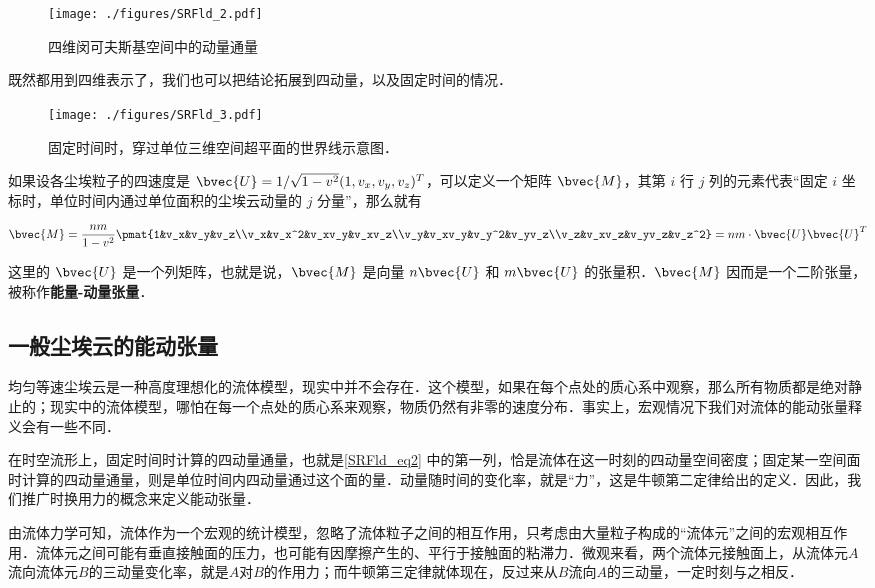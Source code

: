 \begin{figure}[ht]
\centering
\texttt{[image: ./figures/SRFld\_2.pdf]}
\caption{四维闵可夫斯基空间中的动量通量} \label{SRFld_fig2}
\end{figure}

既然都用到四维表示了，我们也可以把结论拓展到四动量，以及固定时间的情况．

\begin{figure}[ht]
\centering
\texttt{[image: ./figures/SRFld\_3.pdf]}
\caption{固定时间时，穿过单位三维空间超平面的世界线示意图．} \label{SRFld_fig3}
\end{figure}

如果设各尘埃粒子的四速度是 $\bvec{U}=1/\sqrt{1-v^2}(1, v_x, v_y, v_z)^T$，可以定义一个矩阵 $\bvec{M}$，其第 $i$ 行 $j$ 列的元素代表“固定 $i$ 坐标时，单位时间内通过单位面积的尘埃云动量的 $j$ 分量”，那么就有

\begin{equation}\label{SRFld_eq2}
\bvec{M}=\frac{nm}{1-v^2}\pmat{1&v_x&v_y&v_z\\v_x&v_x^2&v_xv_y&v_xv_z\\v_y&v_xv_y&v_y^2&v_yv_z\\v_z&v_xv_z&v_yv_z&v_z^2}=nm\cdot\bvec{U}\bvec{U}^T
\end{equation}

这里的 $\bvec{U}$ 是一个列矩阵，也就是说，$\bvec{M}$ 是向量 $n\bvec{U}$ 和 $m\bvec{U}$ 的张量积．$\bvec{M}$ 因而是一个二阶张量，被称作\textbf{能量-动量张量}．


\subsection{一般尘埃云的能动张量}

均匀等速尘埃云是一种高度理想化的流体模型，现实中并不会存在．这个模型，如果在每个点处的质心系中观察，那么所有物质都是绝对静止的；现实中的流体模型，哪怕在每一个点处的质心系来观察，物质仍然有非零的速度分布．事实上，宏观情况下我们对流体的能动张量释义会有一些不同．

在时空流形上，固定时间时计算的四动量通量，也就是\autoref{SRFld_eq2} 中的第一列，恰是流体在这一时刻的四动量空间密度；固定某一空间面时计算的四动量通量，则是单位时间内四动量通过这个面的量．动量随时间的变化率，就是“力”，这是牛顿第二定律给出的定义．因此，我们推广时换用力的概念来定义能动张量．

由流体力学可知，流体作为一个宏观的统计模型，忽略了流体粒子之间的相互作用，只考虑由大量粒子构成的“流体元”之间的宏观相互作用．流体元之间可能有垂直接触面的压力，也可能有因摩擦产生的、平行于接触面的粘滞力．微观来看，两个流体元接触面上，从流体元$A$流向流体元$B$的三动量变化率，就是$A$对$B$的作用力；而牛顿第三定律就体现在，反过来从$B$流向$A$的三动量，一定时刻与之相反．

